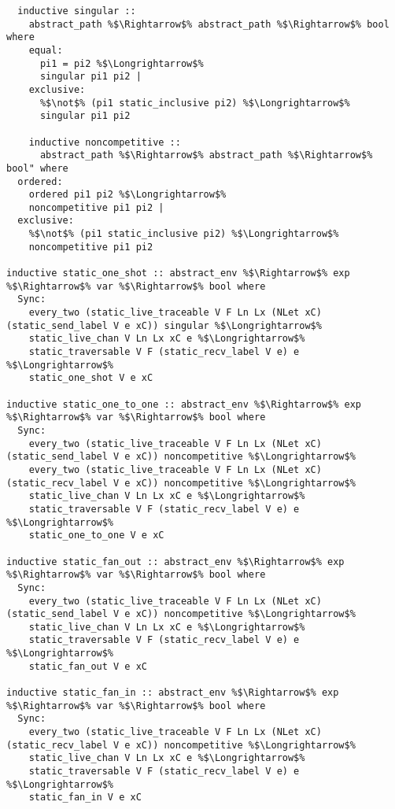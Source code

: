 \documentclass{article}
\begin{document}
\begin{lstlisting}[style=codestyle1, escapechar=\%]


  
  inductive singular ::
    abstract_path %$\Rightarrow$% abstract_path %$\Rightarrow$% bool where
    equal:
      pi1 = pi2 %$\Longrightarrow$% 
      singular pi1 pi2 |
    exclusive:
      %$\not$% (pi1 static_inclusive pi2) %$\Longrightarrow$% 
      singular pi1 pi2

    inductive noncompetitive ::
      abstract_path %$\Rightarrow$% abstract_path %$\Rightarrow$% bool" where
  ordered:
    ordered pi1 pi2 %$\Longrightarrow$% 
    noncompetitive pi1 pi2 |
  exclusive:
    %$\not$% (pi1 static_inclusive pi2) %$\Longrightarrow$% 
    noncompetitive pi1 pi2

inductive static_one_shot :: abstract_env %$\Rightarrow$% exp %$\Rightarrow$% var %$\Rightarrow$% bool where
  Sync:
    every_two (static_live_traceable V F Ln Lx (NLet xC) (static_send_label V e xC)) singular %$\Longrightarrow$%
    static_live_chan V Ln Lx xC e %$\Longrightarrow$%
    static_traversable V F (static_recv_label V e) e %$\Longrightarrow$%
    static_one_shot V e xC

inductive static_one_to_one :: abstract_env %$\Rightarrow$% exp %$\Rightarrow$% var %$\Rightarrow$% bool where
  Sync:
    every_two (static_live_traceable V F Ln Lx (NLet xC) (static_send_label V e xC)) noncompetitive %$\Longrightarrow$%
    every_two (static_live_traceable V F Ln Lx (NLet xC) (static_recv_label V e xC)) noncompetitive %$\Longrightarrow$%
    static_live_chan V Ln Lx xC e %$\Longrightarrow$%
    static_traversable V F (static_recv_label V e) e %$\Longrightarrow$%
    static_one_to_one V e xC

inductive static_fan_out :: abstract_env %$\Rightarrow$% exp %$\Rightarrow$% var %$\Rightarrow$% bool where
  Sync:
    every_two (static_live_traceable V F Ln Lx (NLet xC) (static_send_label V e xC)) noncompetitive %$\Longrightarrow$%
    static_live_chan V Ln Lx xC e %$\Longrightarrow$%
    static_traversable V F (static_recv_label V e) e %$\Longrightarrow$%
    static_fan_out V e xC

inductive static_fan_in :: abstract_env %$\Rightarrow$% exp %$\Rightarrow$% var %$\Rightarrow$% bool where
  Sync:
    every_two (static_live_traceable V F Ln Lx (NLet xC) (static_recv_label V e xC)) noncompetitive %$\Longrightarrow$%
    static_live_chan V Ln Lx xC e %$\Longrightarrow$%
    static_traversable V F (static_recv_label V e) e %$\Longrightarrow$%
    static_fan_in V e xC

  \end{lstlisting}
    
\end{document}
